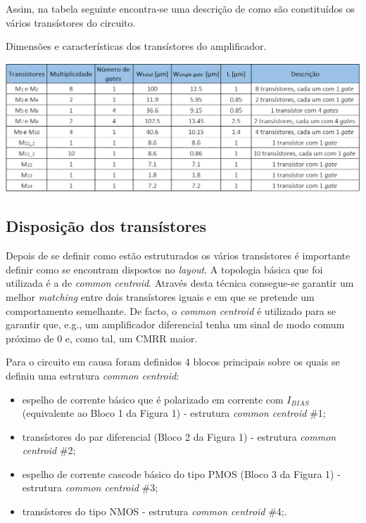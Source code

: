 \documentclass[11pt]{article}
\numberwithin{equation}{section}
\begin{document}

Assim, na tabela seguinte encontra-se uma descrição de como são constituídos os vários transístores do circuito.

\begin{table}[H]
	\centering
	\caption{Dimensões e características dos transístores do amplificador.}
	\vspace{-1.5mm}
	\includegraphics[keepaspectratio=true, scale=0.30]{teoricas/dimensoes2}
\end{table}

\subsection{Disposição dos transístores}

Depois de se definir como estão estruturados os vários transístores é importante definir como se encontram dispostos no \textit{layout}. A topologia básica que foi utilizada é a de \textit{common centroid}. Através desta técnica consegue-se garantir um melhor \textit{matching} entre dois transístores iguais e em que se pretende um comportamento semelhante. De facto, o \textit{common centroid} é utilizado para se garantir que, e.g., um amplificador diferencial tenha um sinal de modo comum próximo de 0 e, como tal, um CMRR maior.

Para o circuito em causa foram definidos 4 blocos principais sobre os quais se definiu uma estrutura \textit{common centroid}:

\vspace{-2mm}

\begin{itemize}
	\item espelho de corrente básico que é polarizado em corrente com $I_{BIAS}$ (equivalente ao Bloco 1 da Figura 1) - estrutura \textit{common centroid} \#1;
	\vspace{-2mm}
	\item transístores do par diferencial (Bloco 2 da Figura 1) - estrutura \textit{common centroid} \#2;
	\vspace{-2mm}
	\item espelho de corrente cascode básico do tipo PMOS (Bloco 3 da Figura 1) - estrutura \textit{common centroid} \#3;
	\vspace{-2mm}
	\item transístores do tipo NMOS - estrutura \textit{common centroid} \#4;.
\end{itemize}
\end{document}
